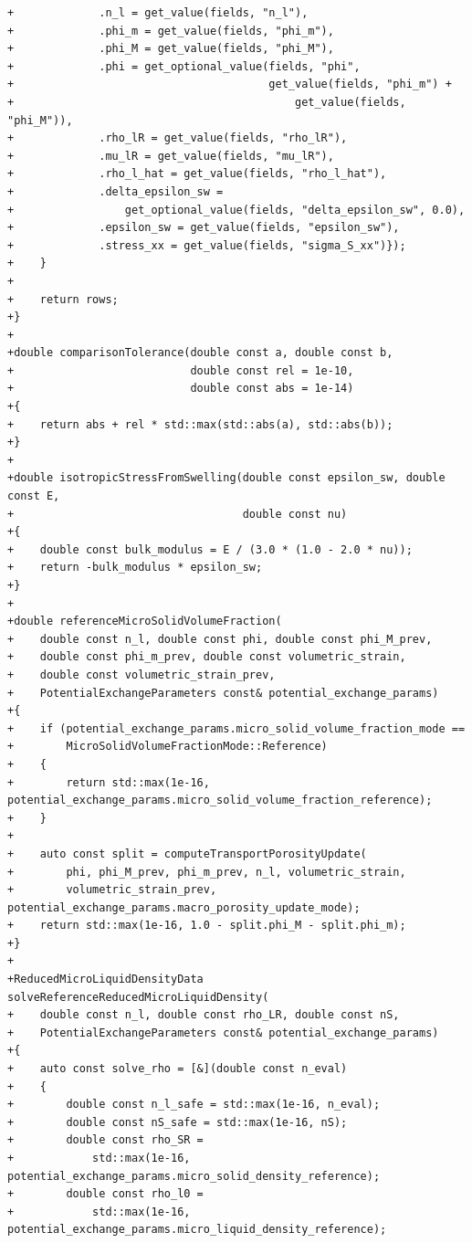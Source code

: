 \documentclass[10pt]{article}
\begin{document}
\begin{lstlisting}
+             .n_l = get_value(fields, "n_l"),
+             .phi_m = get_value(fields, "phi_m"),
+             .phi_M = get_value(fields, "phi_M"),
+             .phi = get_optional_value(fields, "phi",
+                                       get_value(fields, "phi_m") +
+                                           get_value(fields, "phi_M")),
+             .rho_lR = get_value(fields, "rho_lR"),
+             .mu_lR = get_value(fields, "mu_lR"),
+             .rho_l_hat = get_value(fields, "rho_l_hat"),
+             .delta_epsilon_sw =
+                 get_optional_value(fields, "delta_epsilon_sw", 0.0),
+             .epsilon_sw = get_value(fields, "epsilon_sw"),
+             .stress_xx = get_value(fields, "sigma_S_xx")});
+    }
+
+    return rows;
+}
+
+double comparisonTolerance(double const a, double const b,
+                           double const rel = 1e-10,
+                           double const abs = 1e-14)
+{
+    return abs + rel * std::max(std::abs(a), std::abs(b));
+}
+
+double isotropicStressFromSwelling(double const epsilon_sw, double const E,
+                                   double const nu)
+{
+    double const bulk_modulus = E / (3.0 * (1.0 - 2.0 * nu));
+    return -bulk_modulus * epsilon_sw;
+}
+
+double referenceMicroSolidVolumeFraction(
+    double const n_l, double const phi, double const phi_M_prev,
+    double const phi_m_prev, double const volumetric_strain,
+    double const volumetric_strain_prev,
+    PotentialExchangeParameters const& potential_exchange_params)
+{
+    if (potential_exchange_params.micro_solid_volume_fraction_mode ==
+        MicroSolidVolumeFractionMode::Reference)
+    {
+        return std::max(1e-16, potential_exchange_params.micro_solid_volume_fraction_reference);
+    }
+
+    auto const split = computeTransportPorosityUpdate(
+        phi, phi_M_prev, phi_m_prev, n_l, volumetric_strain,
+        volumetric_strain_prev, potential_exchange_params.macro_porosity_update_mode);
+    return std::max(1e-16, 1.0 - split.phi_M - split.phi_m);
+}
+
+ReducedMicroLiquidDensityData solveReferenceReducedMicroLiquidDensity(
+    double const n_l, double const rho_LR, double const nS,
+    PotentialExchangeParameters const& potential_exchange_params)
+{
+    auto const solve_rho = [&](double const n_eval)
+    {
+        double const n_l_safe = std::max(1e-16, n_eval);
+        double const nS_safe = std::max(1e-16, nS);
+        double const rho_SR =
+            std::max(1e-16, potential_exchange_params.micro_solid_density_reference);
+        double const rho_l0 =
+            std::max(1e-16, potential_exchange_params.micro_liquid_density_reference);

\end{lstlisting}
\end{document}
